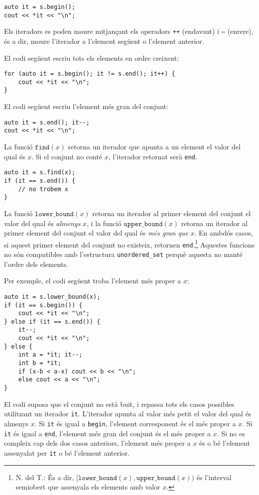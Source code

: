\begin{lstlisting}
auto it = s.begin();
cout << *it << "\n";
\end{lstlisting}

Els iteradors es poden moure mitjançant els operadors
\texttt{++} (endavant) i \texttt{--} (enrere),
és a dir, moure l'iterador a l'element següent
o l'element anterior.

El codi següent escriu tots els elements
en ordre creixent:
\begin{lstlisting}
for (auto it = s.begin(); it != s.end(); it++) {
    cout << *it << "\n";
}
\end{lstlisting}
El codi següent escriu l'element més gran del conjunt:
\begin{lstlisting}
auto it = s.end(); it--;
cout << *it << "\n";
\end{lstlisting}

La funció $\texttt{find}(x)$ retorna un iterador
que apunta a un element el valor del qual és $x$.
Si el conjunt no conté $x$,
l'iterador retornat serà \texttt{end}.

\begin{lstlisting}
auto it = s.find(x);
if (it == s.end()) {
    // no trobem x
}
\end{lstlisting}

La funció $\texttt{lower\_bound}(x)$ retorna
un iterador al primer element del conjunt
el valor del qual és \emph{almenys} $x$, i
la funció $\texttt{upper\_bound}(x)$
retorna un iterador al primer element del conjunt
el valor del qual és \emph{més gran que} $x$.
En ambdós casos, si aquest primer element del conjunt
no existeix, retornen \texttt{end}.\footnote{N. del T.: És a dir,
$[\texttt{lower\_bound}(x), \texttt{upper\_bound}(x))$ és l'interval
semiobert que assenyala els elements amb valor $x$.}
Aquestes funcions no són compatibles amb
l'estructura \texttt{unordered\_set} perquè aquesta
no manté l'ordre dels elements.

Per exemple, el codi següent troba l'element
més proper a $x$:

\begin{lstlisting}
auto it = s.lower_bound(x);
if (it == s.begin()) {
    cout << *it << "\n";
} else if (it == s.end()) {
    it--;
    cout << *it << "\n";
} else {
    int a = *it; it--;
    int b = *it;
    if (x-b < a-x) cout << b << "\n";
    else cout << a << "\n";
}
\end{lstlisting}

El codi suposa que el conjunt no està buit,
i repassa tots els casos possibles
utilitzant un iterador \texttt{it}.
L'iterador apunta al valor més petit
el valor del qual és almenys $x$.
Si \texttt{it} és igual a \texttt{begin},
l'element corresponent és el més proper a $x$.
Si \texttt{it} és igual a \texttt{end},
l'element més gran del conjunt és el més proper a $x$.
Si no es compleix cap dels dos casos anteriors,
l'element més proper a $x$ és o bé l'element assenyalat
per \texttt{it} o bé l'element anterior.

